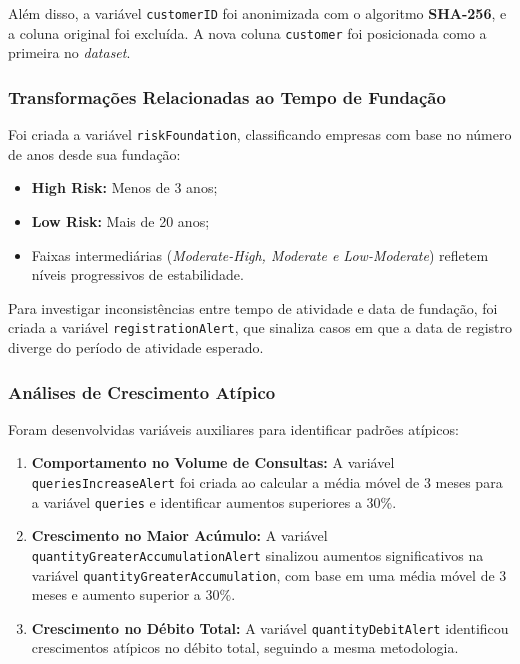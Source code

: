 \documentclass[12pt,a4paper]{article}
\begin{document}
Além disso, a variável \texttt{customerID} foi anonimizada com o algoritmo \textbf{SHA-256}, e a coluna original foi excluída. A nova coluna \texttt{customer} foi posicionada como a primeira no \textit{dataset}.

\subsubsection{Transformações Relacionadas ao Tempo de Fundação}

Foi criada a variável \texttt{riskFoundation}, classificando empresas com base no número de anos desde sua fundação:
\begin{itemize}
    \item \textbf{High Risk:} Menos de 3 anos;
    \item \textbf{Low Risk:} Mais de 20 anos;
    \item Faixas intermediárias (\textit{Moderate-High, Moderate e Low-Moderate}) refletem níveis progressivos de estabilidade.
\end{itemize}

Para investigar inconsistências entre tempo de atividade e data de fundação, foi criada a variável \texttt{registrationAlert}, que sinaliza casos em que a data de registro diverge do período de atividade esperado.

\subsubsection{Análises de Crescimento Atípico}

Foram desenvolvidas variáveis auxiliares para identificar padrões atípicos:
\begin{enumerate}
    \item \textbf{Comportamento no Volume de Consultas:} A variável \texttt{queriesIncreaseAlert} foi criada ao calcular a média móvel de 3 meses para a variável \texttt{queries} e identificar aumentos superiores a 30\%.
    \item \textbf{Crescimento no Maior Acúmulo:} A variável \texttt{quantityGreaterAccumulationAlert} sinalizou aumentos significativos na variável \texttt{quantityGreaterAccumulation}, com base em uma média móvel de 3 meses e aumento superior a 30\%.
    \item \textbf{Crescimento no Débito Total:} A variável \texttt{quantityDebitAlert} identificou crescimentos atípicos no débito total, seguindo a mesma metodologia.
\end{enumerate}
\end{document}
